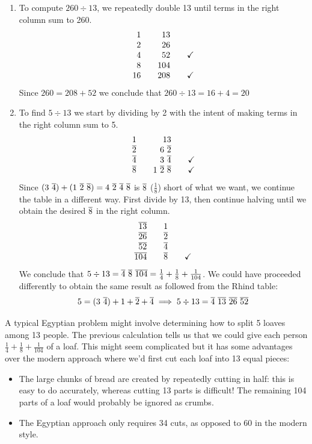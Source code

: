 \begin{enumerate}
	\item To compute $260\div 13$, we repeatedly double 13 until terms in the right column sum to 260.
\[\begin{array}{r@{\qquad}r@{\qquad}c}
1&13\\
2&26\\
4&52&\checkmark\\
8&104\\
16&208&\checkmark
\end{array}\]
Since $260=208+52$ we conclude that $260\div 13=16+4=20$
\item To find $5\div 13$ we start by dividing by 2 with the intent of making terms in the right column sum to 5.
\[\begin{array}{r@{\qquad}r@{\qquad}c}
1&13\\
\cl 2&6\ \cl 2\\
\cl 4&3\ \cl 4&\checkmark\\
\cl 8&1\ \cl 2\ \cl 8&\checkmark
\end{array}\]
Since $(3\ \overline{4})+(1\ \overline{2}\ \overline{8})=4\ \overline{2}\ \overline{4}\ \overline{8}$ is $\overline{8}$ ($\frac 18$) short of what we want, we continue the table in a different way. First divide by 13, then continue halving until we obtain the desired $\overline{8}$ in the right column.
\[\begin{array}{r@{\qquad}r@{\qquad}c}
\cl{13}&1\\
\cl{26}&\cl 2\\
\cl{52}&\cl 4\\
\cl{104}&\cl 8&\checkmark
\end{array}\]
We conclude that $5\div 13=\overline{4}\ \overline{8}\ \overline{104} =\frac 14+\frac 18+\frac 1{104}$. We could have proceeded differently to obtain the same result as followed from the Rhind table:
\[5=(3\ \cl 4)+1+\cl 2+\cl 4\implies 5\div 13=\cl 4\ \cl{13}\ \cl{26}\ \cl{52}\]
\end{enumerate}

\goodbreak




A typical Egyptian problem might involve determining how to split 5 loaves among 13 people. The previous calculation tells us that we could give each person $\frac 14+\frac 18+\frac 1{104}$ of a loaf. This might seem complicated but it has some advantages over the modern approach where we'd first cut each loaf into 13 equal pieces:
\begin{itemize}
  \item The large chunks of bread are created by repeatedly cutting in half: this is easy to do accurately, whereas cutting 13\th{} parts is difficult! The remaining 104\th{} parts of a loaf would probably be ignored as crumbs.
  \item The Egyptian approach only requires 34 cuts, as opposed to 60 in the modern style.
\end{itemize}



